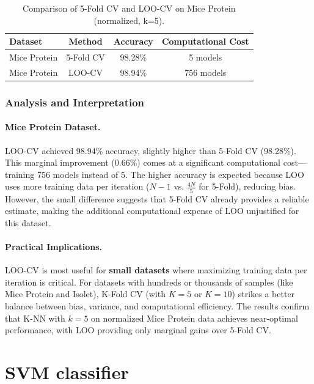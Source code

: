 \documentclass[12pt]{article}
\begin{document}
\begin{table}[H]
\centering
\begin{tabular}{lccc}
\toprule
\textbf{Dataset} & \textbf{Method} & \textbf{Accuracy} & \textbf{Computational Cost} \\
\midrule
Mice Protein & 5-Fold CV & 98.28\% & 5 models \\
Mice Protein & LOO-CV & 98.94\% & 756 models \\
\bottomrule
\end{tabular}
\caption{Comparison of 5-Fold CV and LOO-CV on Mice Protein (normalized, k=5).}
\label{tab:loo_results}
\end{table}

\subsubsection{Analysis and Interpretation}

\paragraph{Mice Protein Dataset.} LOO-CV achieved 98.94\% accuracy, slightly higher than 5-Fold CV (98.28\%). This marginal improvement (0.66\%) comes at a significant computational cost—training 756 models instead of 5. The higher accuracy is expected because LOO uses more training data per iteration ($N-1$ vs. $\frac{4N}{5}$ for 5-Fold), reducing bias. However, the small difference suggests that 5-Fold CV already provides a reliable estimate, making the additional computational expense of LOO unjustified for this dataset.

\paragraph{Practical Implications.} LOO-CV is most useful for \textbf{small datasets} where maximizing training data per iteration is critical. For datasets with hundreds or thousands of samples (like Mice Protein and Isolet), K-Fold CV (with $K=5$ or $K=10$) strikes a better balance between bias, variance, and computational efficiency. The results confirm that K-NN with $k=5$ on normalized Mice Protein data achieves near-optimal performance, with LOO providing only marginal gains over 5-Fold CV.

\section{SVM classifier}
\end{document}
